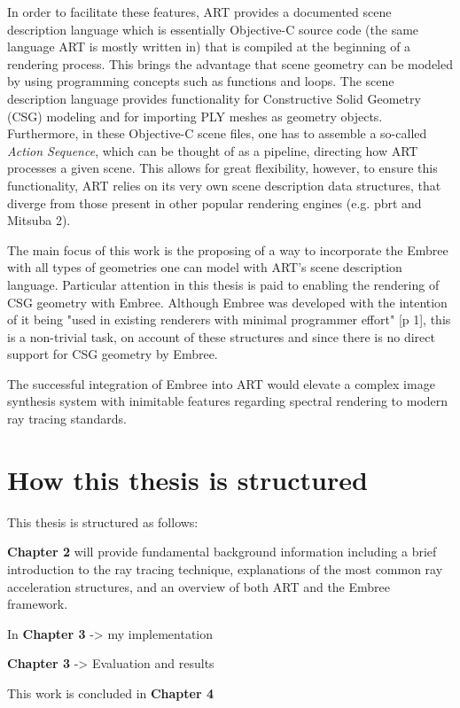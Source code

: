 In order to facilitate these features, ART provides a documented scene description language which is essentially Objective-C source code (the same language ART is mostly written in) that is compiled at the beginning of a rendering process. This brings the advantage that scene geometry can be modeled by using programming concepts  such as functions and loops. The scene description language provides functionality for Constructive Solid Geometry (CSG) modeling and for importing PLY meshes as geometry objects. Furthermore, in these Objective-C scene files, one has to assemble a so-called \emph{Action Sequence}, which can be thought of as a pipeline, directing how ART processes a given scene. 
This allows for great flexibility, however, to ensure this functionality, ART relies on its very own scene description data structures, that diverge from those present in other popular rendering engines (e.g. pbrt \cite{pharr2016physically} and Mitsuba 2).

The main focus of this work is the proposing of a way to incorporate the Embree with all types of geometries one can model with ART's scene description language. Particular attention in this thesis is paid to enabling the rendering of CSG geometry with Embree. 
Although Embree was developed with the intention of it being "used in existing renderers with minimal programmer effort" \cite{wald2014embree}[p 1], this is a non-trivial task, on account of these structures and since there is no direct support for CSG geometry by Embree.

The successful integration of Embree into ART would elevate a complex image synthesis system with inimitable features regarding spectral rendering to modern ray tracing standards. 


\section*{How this thesis is structured}

This thesis is structured as follows: 

\textbf{Chapter 2} will provide fundamental background information including a brief introduction to the ray tracing technique, explanations of the most common ray acceleration structures, and an overview of both ART and the Embree framework.

In \textbf{Chapter 3}  -> my implementation

\textbf{Chapter 3} -> Evaluation and results

This work is concluded in \textbf{Chapter 4}